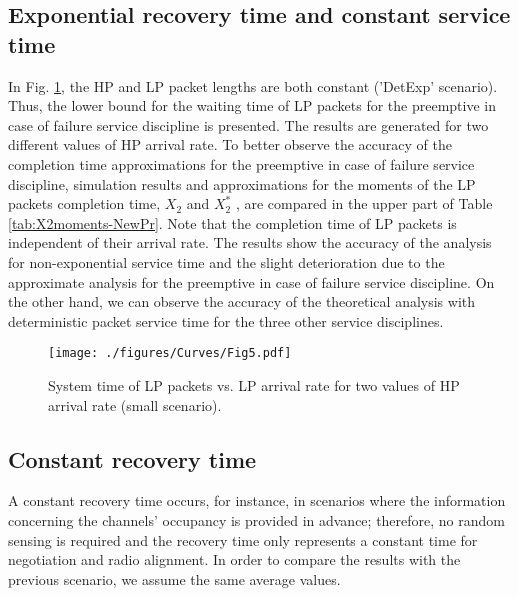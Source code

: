 \documentclass[11pt,journal,oneside,onecolumn,draftclsnofoot]{IEEEtran}
\begin{document}
\subsection{Exponential recovery time and constant service time}

In Fig. \ref{29212-27212-DESmall}, the HP and LP packet lengths are both constant ('DetExp' scenario). Thus, the lower bound for the waiting time of LP packets for the preemptive in case of failure service discipline is presented. The results are generated for two different values of HP arrival rate. To better observe the accuracy of the completion time approximations for the preemptive in case of failure service discipline, simulation results and approximations for the moments of the LP packets completion time, $X_2$ and $X^*_2$ , are compared in the upper part of Table \ref{tab:X2moments-NewPr}. Note that the completion time of LP packets is independent of their arrival rate. The results show the accuracy of the analysis for non-exponential service time and the slight deterioration due to the approximate analysis for the preemptive in case of failure service discipline. On the other hand, we can observe the accuracy of the theoretical analysis with deterministic packet service time for the three other service disciplines.
\begin{figure}\texttt{[image: ./figures/Curves/Fig5.pdf]}\caption{System time of LP packets vs. LP arrival rate for two values of HP arrival rate (small scenario).}\label{29212-27212-DESmall}\end{figure}

\subsection{Constant recovery time}
A constant recovery time occurs, for instance, in scenarios where the information concerning the channels' occupancy is provided in advance; therefore, no random sensing is required and the recovery time only represents a constant time for negotiation and radio alignment. In order to compare the results with the previous scenario, we assume the same average values. 
\end{document}
